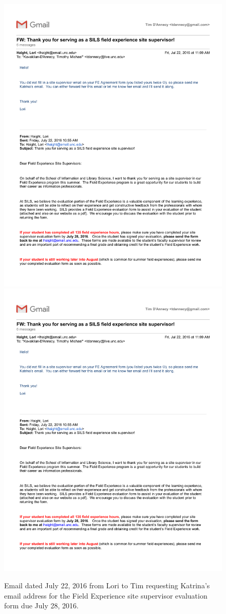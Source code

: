 \begin{figure}
   \centering
       \noindent\includegraphics[page=1,width=.45\textwidth]{documents/2016-07-22-Email-Lori-Tim} \hfill 
       \noindent\includegraphics[page=2,width=.45\textwidth]{documents/2016-07-22-Email-Lori-Tim} \hfill 
 \caption{Email dated July 22, 2016 from Lori to Tim requesting Katrina's email address for the Field Experience site supervisor evaluation form due July 28, 2016.}
 \label{fig:2016-07-22-Email-Lori-Tim}
\end{figure}
\clearpage
